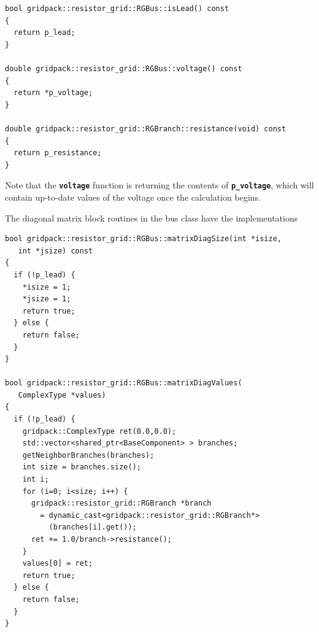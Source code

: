 \documentclass[12pt]{report} %
\begin{document}
{
\color{red}
\begin{Verbatim}[fontseries=b]
bool gridpack::resistor_grid::RGBus::isLead() const
{
  return p_lead;
}

double gridpack::resistor_grid::RGBus::voltage() const
{
  return *p_voltage;
}

double gridpack::resistor_grid::RGBranch::resistance(void) const
{
  return p_resistance;
}
\end{Verbatim}
}

Note that the \texttt{\textbf{voltage}} function is returning the contents of \texttt{\textbf{p\_voltage}}, which will contain up-to-date values of the voltage once the calculation begins.

The diagonal matrix block routines in the bus class have the implementations

{
\color{red}
\begin{Verbatim}[fontseries=b]
bool gridpack::resistor_grid::RGBus::matrixDiagSize(int *isize,
   int *jsize) const
{
  if (!p_lead) {
    *isize = 1;
    *jsize = 1;
    return true;
  } else {
    return false;
  }
}

bool gridpack::resistor_grid::RGBus::matrixDiagValues(
   ComplexType *values)
{
  if (!p_lead) {
    gridpack::ComplexType ret(0.0,0.0);
    std::vector<shared_ptr<BaseComponent> > branches;
    getNeighborBranches(branches);
    int size = branches.size();
    int i;
    for (i=0; i<size; i++) {
      gridpack::resistor_grid::RGBranch *branch
        = dynamic_cast<gridpack::resistor_grid::RGBranch*>
          (branches[i].get());
      ret += 1.0/branch->resistance();
    }
    values[0] = ret;
    return true;
  } else {
    return false;
  }
}
\end{Verbatim}
}
\end{document}
